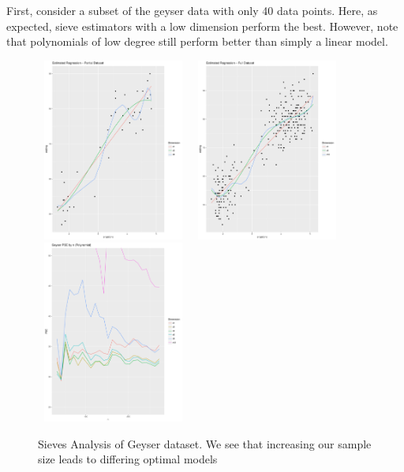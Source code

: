 \documentclass[12pt]{article}  %
\begin{document}
First, consider a subset of the geyser data with only 40 data points.  Here, as expected, sieve estimators with a low dimension perform the best. However, note that polynomials of low degree still perform better than simply a linear model.
\begin{figure}[h]
    \centering
    \includegraphics[width=0.45\textwidth, height = 6cm]{Geyser_Small_Data.pdf}
    \includegraphics[width=0.45\textwidth, height = 6cm]{Geyser_Full.pdf}\\
    \includegraphics[width=0.45\textwidth, height = 6cm]{Geyser_PSE.pdf}\\
    \caption{Sieves Analysis of Geyser dataset. We see that increasing our sample size leads to differing optimal models}
    \label{fig:Geyser}{}
\end{figure}
\end{document}
